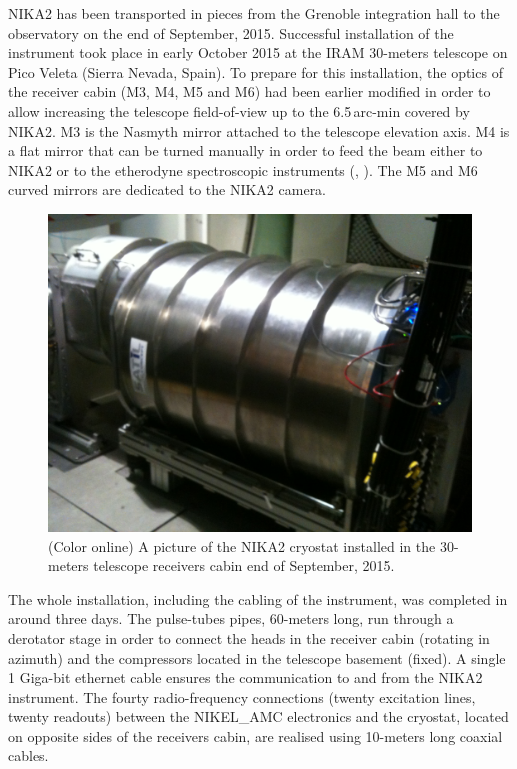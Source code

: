 \documentclass[]{aa} %
\begin{document}
NIKA2 has been transported in pieces from the Grenoble integration hall to the observatory on the end of September, 2015. Successful installation of the instrument took place in early October 2015 at the IRAM 30-meters telescope on Pico Veleta (Sierra Nevada, Spain). To prepare for this installation, the optics of the receiver cabin (M3, M4, M5 and M6) had been earlier modified in order to allow increasing the telescope field-of-view up to the 6.5\,arc-min covered by NIKA2. M3 is the Nasmyth mirror attached to the telescope elevation axis. M4 is a flat mirror that can be turned manually in order to feed the beam either to NIKA2 or to the etherodyne spectroscopic instruments (\cite{Carter2012}, \cite{Schuster2004}). The M5 and M6 curved mirrors are dedicated to the NIKA2 camera. 

\begin{figure}[h]
   \centering
    \includegraphics[width=.85\linewidth]{NIKA2cryo.jpg}
      \caption{(Color online) A picture of the NIKA2 cryostat installed in the 30-meters telescope receivers cabin end of September, 2015.}
         \label{Fig5}
\end{figure}

The whole installation, including the cabling of the instrument, was completed in around three days. The pulse-tubes pipes, 60-meters long, run through a derotator stage in order to connect the heads in the receiver cabin (rotating in azimuth) and the compressors located in the telescope basement (fixed). A single 1 Giga-bit ethernet cable ensures the communication to and from the NIKA2 instrument. The fourty radio-frequency connections (twenty excitation lines, twenty readouts) between the NIKEL\_AMC electronics and the cryostat, located on opposite sides of the receivers cabin, are realised using 10-meters long coaxial cables. 
\end{document}
